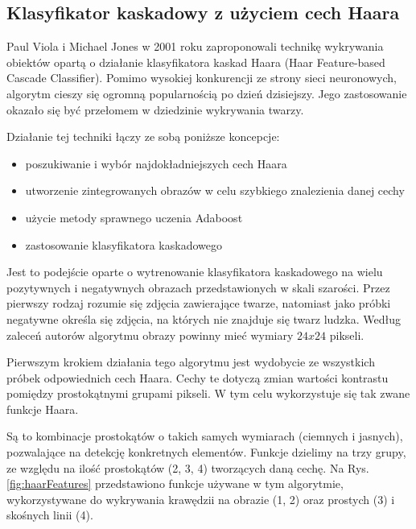 \subsection{Klasyfikator kaskadowy z użyciem cech Haara}
Paul Viola i Michael Jones w 2001 roku zaproponowali technikę wykrywania obiektów opartą o działanie klasyfikatora kaskad Haara (Haar Feature-based Cascade Classifier). Pomimo wysokiej konkurencji ze strony sieci neuronowych, algorytm cieszy się ogromną popularnością po dzień dzisiejszy. \cite{haarCascade}Jego zastosowanie okazało się być przełomem w dziedzinie wykrywania twarzy. 

Działanie tej techniki \cite{haar} łączy ze sobą poniższe koncepcje:
\begin{itemize}
    \item poszukiwanie i wybór najdokładniejszych cech Haara
    \item utworzenie zintegrowanych obrazów w celu szybkiego znalezienia danej cechy
    \item użycie metody sprawnego uczenia Adaboost
    \item zastosowanie klasyfikatora kaskadowego%
\end{itemize}

Jest to podejście oparte o wytrenowanie klasyfikatora kaskadowego na wielu pozytywnych i negatywnych obrazach przedstawionych w skali szarości. Przez pierwszy rodzaj rozumie się zdjęcia zawierające twarze, natomiast jako próbki negatywne określa się zdjęcia, na których nie znajduje się twarz ludzka. Według zaleceń autorów algorytmu obrazy powinny mieć wymiary $24x24$ pikseli.

Pierwszym krokiem działania tego algorytmu jest wydobycie ze wszystkich próbek odpowiednich cech Haara. Cechy te dotyczą zmian wartości kontrastu pomiędzy prostokątnymi grupami pikseli. W tym celu wykorzystuje się tak zwane funkcje Haara.

Są to kombinacje prostokątów  o takich samych wymiarach (ciemnych i jasnych), pozwalające na detekcję konkretnych elementów. Funkcje dzielimy na trzy grupy, ze względu na ilość prostokątów (2, 3, 4) tworzących daną cechę. Na Rys. \ref{fig:haarFeatures} przedstawiono funkcje używane w tym algorytmie, wykorzystywane do wykrywania krawędzii na obrazie (1, 2) oraz prostych (3) i skośnych linii (4).

